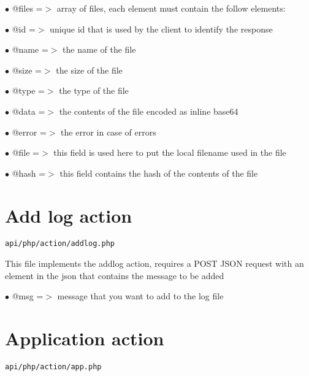 \documentclass[a4paper]{book}
\begin{document}
\begin{compactitem}
\item[\color{myblue}$\bullet$] @files =$>$ array of files, each element must contain the follow elements:
\item[\color{myblue}$\bullet$] @id    =$>$ unique id that is used by the client to identify the response
\item[\color{myblue}$\bullet$] @name  =$>$ the name of the file
\item[\color{myblue}$\bullet$] @size  =$>$ the size of the file
\item[\color{myblue}$\bullet$] @type  =$>$ the type of the file
\item[\color{myblue}$\bullet$] @data  =$>$ the contents of the file encoded as inline base64
\item[\color{myblue}$\bullet$] @error =$>$ the error in case of errors
\item[\color{myblue}$\bullet$] @file  =$>$ this field is used here to put the local filename used in the file
\item[\color{myblue}$\bullet$] @hash  =$>$ this field contains the hash of the contents of the file
\end{compactitem}

\hypertarget{toc4}{}
\section{Add log action}

\begin{lstlisting}
api/php/action/addlog.php
\end{lstlisting}

This file implements the addlog action, requires a POST JSON request
with an element in the json that contains the message to be added

\begin{compactitem}
\item[\color{myblue}$\bullet$] @msg =$>$ message that you want to add to the log file
\end{compactitem}

\hypertarget{toc5}{}
\section{Application action}

\begin{lstlisting}
api/php/action/app.php
\end{lstlisting}
\end{document}
